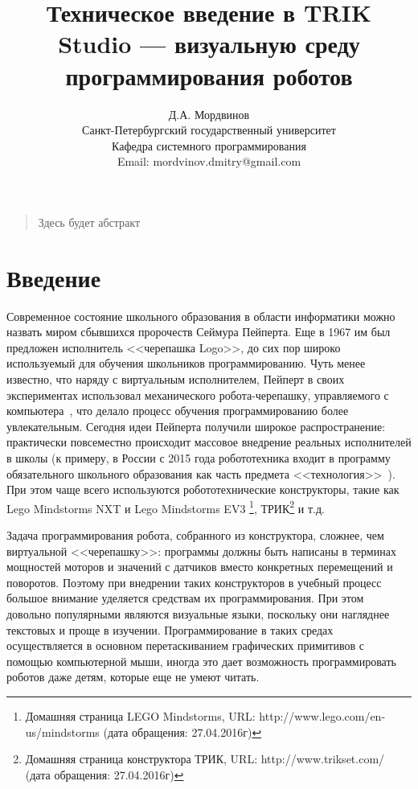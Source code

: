 \documentclass[a5paper]{article}
\title{Техническое введение в TRIK Studio --- визуальную среду программирования роботов}
\author{
	Д.А. Мордвинов \\
	Санкт-Петербургский государственный университет\\
	Кафедра системного программирования\\
	Email: mordvinov.dmitry@gmail.com
}
\date{}
\begin{document}
\maketitle
\thispagestyle{empty}

\begin{quote}
\small\noindent Здесь будет абстракт
\end{quote}

\section*{Введение}
\label{chapter:introduction}

Современное состояние школьного образования в области информатики можно назвать миром сбывшихся пророчеств Сеймура Пейперта. Еще в 1967 им был предложен исполнитель <<черепашка Logo>>, до сих пор широко используемый для обучения школьников программированию. Чуть менее известно, что наряду с виртуальным исполнителем, Пейперт в своих экспериментах использовал механического робота-черепашку, управляемого с компьютера~\cite{papert1980mindstorms}, что делало процесс обучения программированию более увлекательным. Сегодня идеи Пейперта получили широкое распространение: практически повсеместно происходит массовое внедрение реальных исполнителей в школы (к примеру, в России с 2015 года робототехника входит в программу обязательного школьного образования как часть предмета <<технология>>~\cite{черёмухин2014внедрение}). При этом чаще всего используются робототехнические конструкторы, такие как Lego Mindstorms NXT и Lego Mindstorms EV3%
\footnote{Домашняя страница LEGO Mindstorms, URL: http://www.lego.com/en-us/mindstorms (дата обращения: 27.04.2016г)}, 
ТРИК\footnote{Домашняя страница конструктора ТРИК, URL: http://www.trikset.com/ (дата обращения: 27.04.2016г)} и т.д. 

Задача программирования робота, собранного из конструктора, сложнее, чем виртуальной <<черепашку>>: программы должны быть написаны в терминах мощностей моторов и значений с датчиков вместо конкретных перемещений и поворотов. Поэтому при внедрении таких конструкторов в учебный процесс большое внимание уделяется средствам их программирования. При этом довольно популярными являются визуальные языки, поскольку они нагляднее текстовых и проще в изучении. Программирование в таких средах осуществляется в основном перетаскиванием графических примитивов с помощью компьютерной мыши, иногда это дает возможность программировать роботов даже детям, которые еще не умеют читать. 
\end{document}
